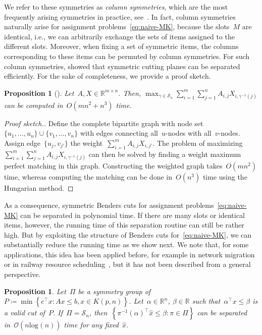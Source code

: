 \documentclass[a4paper,10pt]{article}
\newcommand{\R}{\mathds{R}}
\newcommand{\fixed}[1]{\hat{ #1 }}
\newcommand{\sym}[1]{\mathcal{S}_{#1}}
\renewcommand{\log}[2][]{\text{log}_{#1}\left( #2 \right)}
\newcommand{\sprod}[2]{#1^\top #2}
\newcommand{\define}{\coloneqq}
\newcommand{\brackets}[1]{\left\{ #1 \right\}}
\newcommand{\parentheses}[1]{\left( #1 \right)}
\newcommand{\Oh}[1]{\mathcal{O}\parentheses{ #1 }}
\newtheorem{proposition}[theorem]{Proposition}
\theoremstyle{definition}
\begin{document}
We refer to these symmetries as \emph{column symmetries}, which are the most frequently arising symmetries in practice, see~\cite{PfetschRehn2019}.
In fact, column symmetries naturally arise for assignment problems~\eqref{eq:naive-MK}, because the slots~$M$ are identical, i.e., we can arbitrarily exchange the sets of items assigned to the different slots.
Moreover, when fixing a set of symmetric items, the columns corresponding to these items can be permuted by column symmetries.
For such column symmetries, \cite{bendotti2026two} showed that symmetric cutting planes can be separated efficiently.
For the sake of completeness, we provide a proof sketch.
%
\begin{proposition}[\cite{bendotti2026two}]
  \label{prop:column-sym}
  Let~$A, X \in \R^{m \times n}$.
  Then, $\max_{\gamma \in \sym{n}}\sum_{i = 1}^m\sum_{j = 1}^n A_{i,j}X_{i,\gamma^{-1}(j)}$ can be computed in~$O(mn^2 + n^3)$ time.
\end{proposition}
\begin{proof}[Proof sketch.]
  Define the complete bipartite graph with node set~$\{u_1,\dots,u_n\} \cup \{v_1,\dots,v_n\}$ with edges connecting all~$u$-nodes with all~$v$-nodes.
  Assign edge~$\{u_j,v_{j'}\}$ the weight~$\sum_{i = 1}^m A_{i,j}X_{i,j'}$.
  The problem of maximizing~$\sum_{i = 1}^m\sum_{j = 1}^n A_{i,j}X_{i,\gamma^{-1}(j)}$ can then be solved by finding a weight maximum perfect matching in this graph.
  Constructing the weighted graph takes~$O(mn^2)$ time, whereas computing the matching can be done in~$O(n^3)$ time using the Hungarian method.
\end{proof}
%
As a consequence, symmetric Benders cuts for assignment problems~\eqref{eq:naive-MK} can be separated in polynomial time.
If there are many slots or identical items, however, the running time of this separation routine can still be rather high.
But by exploiting the structure of Benders cuts for~\eqref{eq:naive-MK}, we can substantially reduce the running time as we show next.
We note that, for some applications, this idea has been applied before, for example in network migration~\cite{Daryalal2023} or in railway resource scheduling~\cite{Han2025}, but it has not been described from a general perspective.
%
\begin{proposition}
  \label{prop:separateSn}
  Let~$\Pi$ be a symmetry group of~$P\define\min\brackets{\sprod{c}{x}: Ax\leq b, x\in K(p, n)}$.
  Let~$\alpha\in\R^n$, $\beta\in\R$ such that~$\sprod{\alpha}{x}\leq \beta$ is a valid cut of~$P$. 
  If~$\Pi = \sym{n}$, then~$\brackets{\sprod{\pi^{-1}(\alpha)}{\fixed{x}} \leq \beta : \pi\in\Pi}$ can be separated in~$\Oh{n\log{n}}$ time for any fixed~$\fixed{x}$.
\end{proposition}
\end{document}
